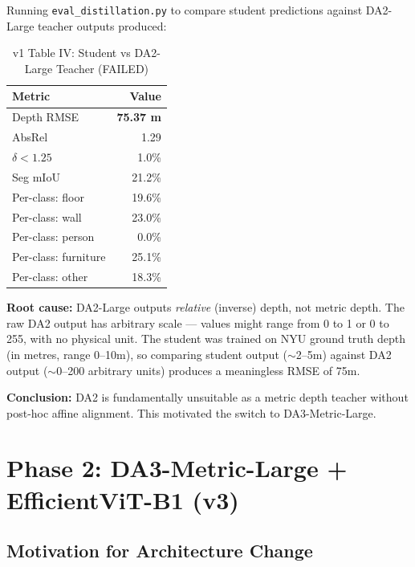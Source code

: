 \documentclass[11pt,a4paper]{article}
\begin{document}
Running \texttt{eval\_distillation.py} to compare student predictions
against DA2-Large teacher outputs produced:

\begin{table}[h]
\centering
\caption{v1 Table IV: Student vs DA2-Large Teacher (FAILED)}
\label{tab:v1-eval}
\begin{tabular}{lr}
\toprule
\textbf{Metric} & \textbf{Value} \\
\midrule
Depth RMSE              & \textcolor{regression}{\textbf{75.37 m}} \\
AbsRel                  & 1.29 \\
$\delta < 1.25$         & 1.0\% \\
Seg mIoU                & 21.2\% \\
\midrule
Per-class: floor        & 19.6\% \\
Per-class: wall         & 23.0\% \\
Per-class: person       & 0.0\% \\
Per-class: furniture    & 25.1\% \\
Per-class: other        & 18.3\% \\
\bottomrule
\end{tabular}
\end{table}

\textbf{Root cause:} DA2-Large outputs \emph{relative} (inverse) depth,
not metric depth. The raw DA2 output has arbitrary scale --- values might
range from 0 to 1 or 0 to 255, with no physical unit. The student was
trained on NYU ground truth depth (in metres, range 0--10m), so comparing
student output ($\sim$2--5m) against DA2 output ($\sim$0--200 arbitrary
units) produces a meaningless RMSE of 75m.

\textbf{Conclusion:} DA2 is fundamentally unsuitable as a metric depth
teacher without post-hoc affine alignment. This motivated the switch to
DA3-Metric-Large.

\section{Phase 2: DA3-Metric-Large + EfficientViT-B1 (v3)}
\label{sec:phase2}

\subsection{Motivation for Architecture Change}
\end{document}
